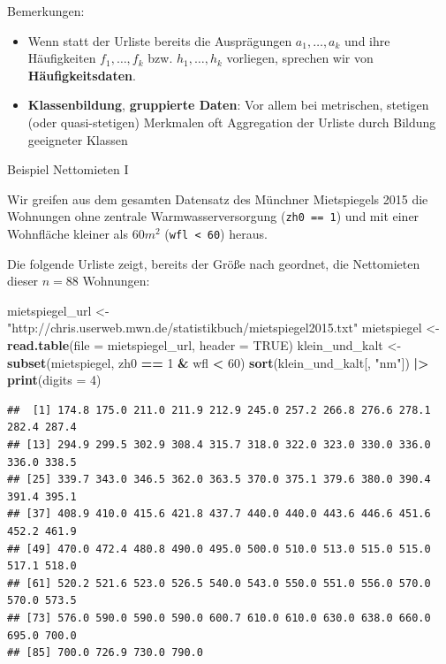 \documentclass[
  10pt,
  ignorenonframetext,
]{beamer}
\newenvironment{Shaded}{\begin{snugshade}}{\end{snugshade}}
\newcommand{\AttributeTok}[1]{\textcolor[rgb]{0.13,0.29,0.53}{#1}}
\newcommand{\ConstantTok}[1]{\textcolor[rgb]{0.56,0.35,0.01}{#1}}
\newcommand{\DecValTok}[1]{\textcolor[rgb]{0.00,0.00,0.81}{#1}}
\newcommand{\FunctionTok}[1]{\textcolor[rgb]{0.13,0.29,0.53}{\textbf{#1}}}
\newcommand{\NormalTok}[1]{#1}
\newcommand{\OtherTok}[1]{\textcolor[rgb]{0.56,0.35,0.01}{#1}}
\newcommand{\SpecialCharTok}[1]{\textcolor[rgb]{0.81,0.36,0.00}{\textbf{#1}}}
\newcommand{\StringTok}[1]{\textcolor[rgb]{0.31,0.60,0.02}{#1}}
\providecommand{\tightlist}{%
  \setlength{\itemsep}{0pt}\setlength{\parskip}{0pt}}
\begin{document}
\begin{frame}{Bemerkungen:}
\label{bemerkungen}
\begin{itemize}
\tightlist
\item
  Wenn statt der Urliste bereits die Ausprägungen \(a_1,\ldots,a_k\) und
  ihre Häufigkeiten \(f_1,\ldots,f_k\) bzw. \(h_1,\ldots,h_k\)
  vorliegen, sprechen wir von \textbf{Häufigkeitsdaten}.
\item
  \textbf{Klassenbildung}, \textbf{gruppierte Daten}: Vor allem bei
  metrischen, stetigen (oder quasi-stetigen) Merkmalen oft Aggregation
  der Urliste durch Bildung geeigneter Klassen
\end{itemize}
\end{frame}

\begin{frame}[fragile]{Beispiel Nettomieten I}
\label{beispiel-nettomieten-i}
\scriptsize\normalsize

Wir greifen aus dem gesamten Datensatz des Münchner Mietspiegels 2015
die Wohnungen ohne zentrale Warmwasserversorgung (\texttt{zh0\ ==\ 1})
und mit einer Wohnfläche kleiner als \(60m^2\)
(\texttt{wfl\ \textless{}\ 60}) heraus.

Die folgende Urliste zeigt, bereits der Größe nach geordnet, die
Nettomieten dieser \(n=88\) Wohnungen:

\scriptsize

\begin{Shaded}
\begin{Highlighting}[]
\NormalTok{mietspiegel\_url }\OtherTok{\textless{}{-}} \StringTok{"http://chris.userweb.mwn.de/statistikbuch/mietspiegel2015.txt"}
\NormalTok{mietspiegel }\OtherTok{\textless{}{-}} \FunctionTok{read.table}\NormalTok{(}\AttributeTok{file =}\NormalTok{ mietspiegel\_url, }\AttributeTok{header =} \ConstantTok{TRUE}\NormalTok{)}
\NormalTok{klein\_und\_kalt }\OtherTok{\textless{}{-}} \FunctionTok{subset}\NormalTok{(mietspiegel, zh0 }\SpecialCharTok{==} \DecValTok{1} \SpecialCharTok{\&}\NormalTok{ wfl }\SpecialCharTok{\textless{}} \DecValTok{60}\NormalTok{)}
\FunctionTok{sort}\NormalTok{(klein\_und\_kalt[, }\StringTok{"nm"}\NormalTok{]) }\SpecialCharTok{|\textgreater{}}
    \FunctionTok{print}\NormalTok{(}\AttributeTok{digits =} \DecValTok{4}\NormalTok{)}
\end{Highlighting}
\end{Shaded}

\begin{verbatim}
##  [1] 174.8 175.0 211.0 211.9 212.9 245.0 257.2 266.8 276.6 278.1 282.4 287.4
## [13] 294.9 299.5 302.9 308.4 315.7 318.0 322.0 323.0 330.0 336.0 336.0 338.5
## [25] 339.7 343.0 346.5 362.0 363.5 370.0 375.1 379.6 380.0 390.4 391.4 395.1
## [37] 408.9 410.0 415.6 421.8 437.7 440.0 440.0 443.6 446.6 451.6 452.2 461.9
## [49] 470.0 472.4 480.8 490.0 495.0 500.0 510.0 513.0 515.0 515.0 517.1 518.0
## [61] 520.2 521.6 523.0 526.5 540.0 543.0 550.0 551.0 556.0 570.0 570.0 573.5
## [73] 576.0 590.0 590.0 590.0 600.7 610.0 610.0 630.0 638.0 660.0 695.0 700.0
## [85] 700.0 726.9 730.0 790.0
\end{verbatim}


\end{frame}
\end{document}
